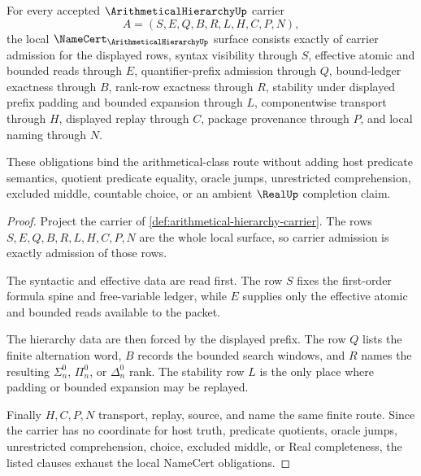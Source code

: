 \begin{theorem}
\label{thm:arithmetical-hierarchy-namecert-obligations}
For every accepted $\ArithmeticalHierarchyUp$ carrier
$$
A=(S,E,Q,B,R,L,H,C,P,N),
$$
the local $\NameCert_{\ArithmeticalHierarchyUp}$ surface consists exactly of carrier admission for the displayed rows, syntax visibility through $S$, effective atomic and bounded reads through $E$, quantifier-prefix admission through $Q$, bound-ledger exactness through $B$, rank-row exactness through $R$, stability under displayed prefix padding and bounded expansion through $L$, componentwise transport through $H$, displayed replay through $C$, package provenance through $P$, and local naming through $N$.

These obligations bind the arithmetical-class route without adding host predicate semantics, quotient predicate equality, oracle jumps, unrestricted comprehension, excluded middle, countable choice, or an ambient $\RealUp$ completion claim.
\end{theorem}
\begin{proof}
Project the carrier of \autoref{def:arithmetical-hierarchy-carrier}. The rows $S,E,Q,B,R,L,H,C,P,N$ are the whole local surface, so carrier admission is exactly admission of those rows.

The syntactic and effective data are read first. The row $S$ fixes the first-order formula spine and free-variable ledger, while $E$ supplies only the effective atomic and bounded reads available to the packet.

The hierarchy data are then forced by the displayed prefix. The row $Q$ lists the finite alternation word, $B$ records the bounded search windows, and $R$ names the resulting $\Sigma^0_n$, $\Pi^0_n$, or $\Delta^0_n$ rank. The stability row $L$ is the only place where padding or bounded expansion may be replayed.

Finally $H,C,P,N$ transport, replay, source, and name the same finite route. Since the carrier has no coordinate for host truth, predicate quotients, oracle jumps, unrestricted comprehension, choice, excluded middle, or Real completeness, the listed clauses exhaust the local NameCert obligations.
\end{proof}

